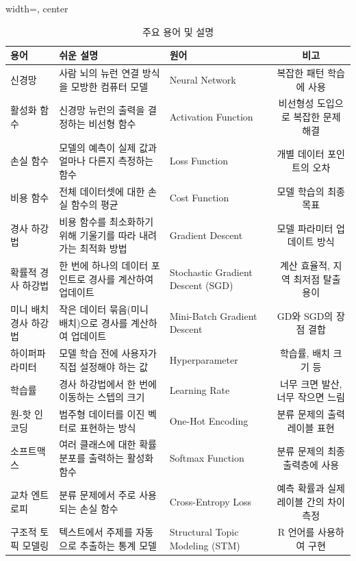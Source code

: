 \documentclass[11pt,a4paper]{article}
\theoremstyle{definition}
\begin{document}
\begin{table}[h!]
\centering
\caption{주요 용어 및 설명}
\label{tab:glossary}
\begin{adjustbox}{width=\textwidth, center}
\begin{tabular}{lllc}
\toprule
\textbf{용어} & \textbf{쉬운 설명} & \textbf{원어} & \textbf{비고} \\
\midrule
신경망 & 사람 뇌의 뉴런 연결 방식을 모방한 컴퓨터 모델 & Neural Network & 복잡한 패턴 학습에 사용 \\
활성화 함수 & 신경망 뉴런의 출력을 결정하는 비선형 함수 & Activation Function & 비선형성 도입으로 복잡한 문제 해결 \\
손실 함수 & 모델의 예측이 실제 값과 얼마나 다른지 측정하는 함수 & Loss Function & 개별 데이터 포인트의 오차 \\
비용 함수 & 전체 데이터셋에 대한 손실 함수의 평균 & Cost Function & 모델 학습의 최종 목표 \\
경사 하강법 & 비용 함수를 최소화하기 위해 기울기를 따라 내려가는 최적화 방법 & Gradient Descent & 모델 파라미터 업데이트 방식 \\
확률적 경사 하강법 & 한 번에 하나의 데이터 포인트로 경사를 계산하여 업데이트 & Stochastic Gradient Descent (SGD) & 계산 효율적, 지역 최저점 탈출 용이 \\
미니 배치 경사 하강법 & 작은 데이터 묶음(미니 배치)으로 경사를 계산하여 업데이트 & Mini-Batch Gradient Descent & GD와 SGD의 장점 결합 \\
하이퍼파라미터 & 모델 학습 전에 사용자가 직접 설정해야 하는 값 & Hyperparameter & 학습률, 배치 크기 등 \\
학습률 & 경사 하강법에서 한 번에 이동하는 스텝의 크기 & Learning Rate & 너무 크면 발산, 너무 작으면 느림 \\
원-핫 인코딩 & 범주형 데이터를 이진 벡터로 표현하는 방식 & One-Hot Encoding & 분류 문제의 출력 레이블 표현 \\
소프트맥스 & 여러 클래스에 대한 확률 분포를 출력하는 활성화 함수 & Softmax Function & 분류 문제의 최종 출력층에 사용 \\
교차 엔트로피 & 분류 문제에서 주로 사용되는 손실 함수 & Cross-Entropy Loss & 예측 확률과 실제 레이블 간의 차이 측정 \\
구조적 토픽 모델링 & 텍스트에서 주제를 자동으로 추출하는 통계 모델 & Structural Topic Modeling (STM) & R 언어를 사용하여 구현 \\
\bottomrule
\end{tabular}%
\end{adjustbox}
\end{table}
\end{document}
